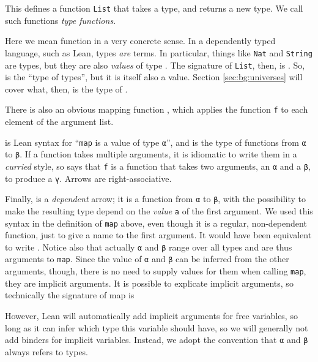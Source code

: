 \documentclass[titlepage]{report}
\newenvironment{remark}{%
\begin{framed}
\begin{trivlist}
    \item[\hskip \labelsep {\bfseries Remark:}]}%
{%
\end{trivlist}%
\end{framed}
}
\newcommand\Type{\lean{Type}}
\begin{document}
This defines a function \texttt{List} that takes a type, and returns a new type.
We call such functions \emph{type functions}.

\begin{remark}
    Here we mean function in a very concrete sense. In a dependently typed language, such as Lean, types \emph{are} terms. In particular, things like \texttt{Nat} and \texttt{String} are types, but they are also \emph{values} of type \Type.
    The signature of \texttt{List}, then, is .
    So, \Type is the ``type of types'', but it is itself also a value.
    Section \ref{sec:bg:universes} will cover what, then, is the type of \Type.
\end{remark}

There is also an obvious mapping function , 
which applies the function \texttt{f} to each element of the argument list.

\begin{remark}
     is Lean syntax for ``\texttt{map} is a value of type \texttt{α}'', and  is the type of functions from \texttt{α} to \texttt{β}. 
    If a function takes multiple arguments, it is idiomatic to write them in a \emph{curried} style,
    so  says that \texttt{f} is a function that takes two arguments, an \texttt{α} and a \texttt{β}, to produce a \texttt{γ}. Arrows are right-associative.

    Finally,  is a \emph{dependent} arrow; it is a function from \texttt{α} to \texttt{β}, with the possibility to make the resulting type depend on the \emph{value} \texttt{a} of the first argument. 
    We used this syntax in the definition of \texttt{map} above, even though it is a regular, non-dependent function, just to give a name to the first argument. 
    It would have been equivalent to write .
    Notice also that actually \texttt{α} and \texttt{β} range over all types and are thus arguments to \texttt{map}. Since the value of \texttt{α} and \texttt{β} can be inferred from the other arguments, though, there is no need to supply values for them when calling \texttt{map}, they are implicit arguments. It is possible to explicate implicit arguments, so technically the signature of map is 
    \begin{center}
    \end{center}
    However, Lean will automatically add implicit arguments for free variables, so long as it can infer which type this variable should have, so we will generally not add binders for implicit variables. Instead, we adopt the convention that \texttt{α} and \texttt{β} always refers to types. 
\end{remark}
\end{document}
